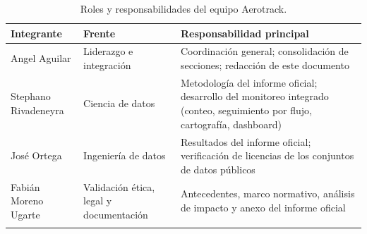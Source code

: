 \begin{longtable}{@{}L{4cm}L{4cm}L{7.5cm}@{}}
\toprule
\textbf{Integrante} & \textbf{Frente} & \textbf{Responsabilidad principal} \\
\midrule
\endhead
Angel Aguilar & Liderazgo e integración & Coordinación general; consolidación de secciones;
  redacción de este documento \\
Stephano Rivadeneyra & Ciencia de datos & Metodología del informe oficial; desarrollo del
  monitoreo integrado (conteo, seguimiento por flujo, cartografía, dashboard) \\
José Ortega & Ingeniería de datos & Resultados del informe oficial; verificación de licencias
  de los conjuntos de datos públicos \\
Fabián Moreno Ugarte & Validación ética, legal y documentación & Antecedentes, marco
  normativo, análisis de impacto y anexo del informe oficial \\
\bottomrule
\caption{Roles y responsabilidades del equipo Aerotrack.}
\label{tab:roles}
\end{longtable}
